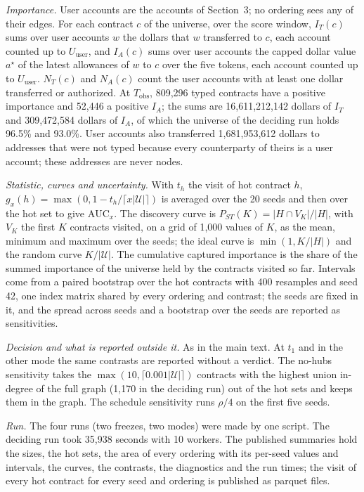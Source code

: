 \documentclass[10pt,letterpaper]{article}
\begin{document}
\textit{Importance.} User accounts are the accounts of Section~3; no ordering sees any of their edges. For each contract $c$ of the universe, over the score window, $I_T(c)$ sums over user accounts $w$ the dollars that $w$ transferred to $c$, each account counted up to $U_{\mathrm{user}}$, and $I_A(c)$ sums over user accounts the capped dollar value $a^{\star}$ of the latest allowances of $w$ to $c$ over the five tokens, each account counted up to $U_{\mathrm{user}}$. $N_T(c)$ and $N_A(c)$ count the user accounts with at least one dollar transferred or authorized. At $T_{\mathrm{obs}}$, 809,296 typed contracts have a positive importance and 52,446 a positive $I_A$; the sums are 16,611,212,142 dollars of $I_T$ and 309,472,584 dollars of $I_A$, of which the universe of the deciding run holds 96.5\% and 93.0\%. User accounts also transferred 1,681,953,612 dollars to addresses that were not typed because every counterparty of theirs is a user account; these addresses are never nodes.

\textit{Statistic, curves and uncertainty.} With $t_h$ the visit of hot contract $h$, $g_x(h)=\max(0,1-t_h/\lceil x|\mathcal{U}|\rceil)$ is averaged over the 20 seeds and then over the hot set to give $\mathrm{AUC}_x$. The discovery curve is $P_{ST}(K)=|H\cap V_K|/|H|$, with $V_K$ the first $K$ contracts visited, on a grid of 1,000 values of $K$, as the mean, minimum and maximum over the seeds; the ideal curve is $\min(1,K/|H|)$ and the random curve $K/|\mathcal{U}|$. The cumulative captured importance is the share of the summed importance of the universe held by the contracts visited so far. Intervals come from a paired bootstrap over the hot contracts with 400 resamples and seed 42, one index matrix shared by every ordering and contrast; the seeds are fixed in it, and the spread across seeds and a bootstrap over the seeds are reported as sensitivities.

\textit{Decision and what is reported outside it.} As in the main text. At $t_1$ and in the other mode the same contrasts are reported without a verdict. The no-hubs sensitivity takes the $\max(10,\lceil 0.001|\mathcal{U}|\rceil)$ contracts with the highest union in-degree of the full graph (1,170 in the deciding run) out of the hot sets and keeps them in the graph. The schedule sensitivity runs $\rho/4$ on the first five seeds.

\textit{Run.} The four runs (two freezes, two modes) were made by one script. The deciding run took 35,938 seconds with 10 workers. The published summaries hold the sizes, the hot sets, the area of every ordering with its per-seed values and intervals, the curves, the contrasts, the diagnostics and the run times; the visit of every hot contract for every seed and ordering is published as parquet files.
\end{document}
